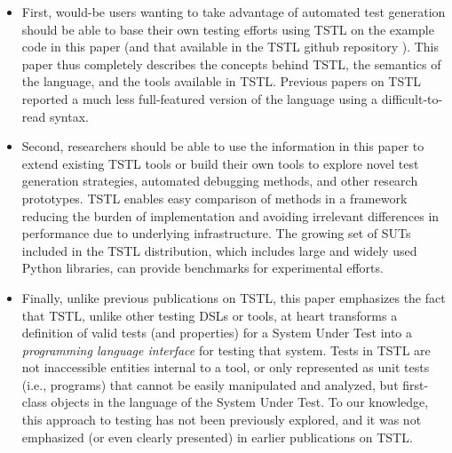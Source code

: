 \begin{itemize}
\item First, would-be users wanting to take advantage of automated
  test generation should be able to base their own testing
  efforts using TSTL on the example code in this paper (and that available
  in the TSTL github repository \cite{tstl}).
  This paper thus completely describes the concepts behind TSTL, the
  semantics of the language, and the tools available in TSTL.
  Previous papers on TSTL \cite{NFM15,ISSTA15} reported a much less full-featured version of the
  language using a difficult-to-read syntax.

\item Second, researchers should be able to use the information in this paper to
  extend existing TSTL tools or build their own tools to explore novel
  test generation strategies, automated debugging methods, and other
  research prototypes.  TSTL enables easy comparison of
  methods in a framework reducing the burden of implementation
  and avoiding irrelevant differences in performance due to underlying
  infrastructure.  The growing set of SUTs
  included in the TSTL distribution, which includes large and widely
  used Python libraries, can provide benchmarks for
  experimental efforts.  

\item Finally, unlike previous publications on TSTL, this paper
  emphasizes the fact that TSTL, unlike other testing DSLs or tools,
  at heart transforms a definition of valid tests (and properties) for
  a System Under Test into a \emph{programming language interface} for testing
  that system.  Tests in TSTL are not inaccessible entities internal to
  a tool,
  or only represented as unit tests (i.e., programs) that cannot be
  easily manipulated and analyzed, but first-class objects in the
  language of the System Under Test.  To our knowledge, this approach
  to testing has not been previously explored, and it was not
  emphasized (or even clearly presented) in earlier publications on TSTL.
\end{itemize}


